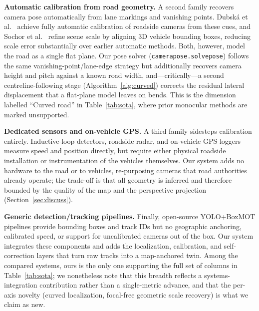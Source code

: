 \documentclass[conference]{IEEEtran}
\renewcommand{\_}{\textunderscore\allowbreak}
\begin{document}
\textbf{Automatic calibration from road geometry.}
A second family recovers camera pose automatically from lane markings and
vanishing points. Dubsk\'a et al.~\cite{dubska2014} achieve fully automatic
calibration of roadside cameras from these cues, and Sochor et
al.~\cite{sochor2019} refine scene scale by aligning 3D vehicle bounding boxes,
reducing scale error substantially over earlier automatic methods. Both, however,
model the road as a single flat plane. Our pose solver
(\texttt{camera\_pose.solve\_pose}) follows the same vanishing-point/lane-edge
strategy but additionally recovers camera height and pitch against a known road
width, and---critically---a second centreline-following stage
(Algorithm~\ref{alg:curved}) corrects the residual lateral displacement that a
flat-plane model leaves on bends. This is the dimension labelled ``Curved road''
in Table~\ref{tab:sota}, where prior monocular methods are marked unsupported.

\textbf{Dedicated sensors and on-vehicle GPS.}
A third family sidesteps calibration entirely. Inductive-loop detectors, roadside
radar, and on-vehicle GPS loggers measure speed and position directly, but require
either physical roadside installation or instrumentation of the vehicles
themselves. Our system adds no hardware to the road or to vehicles, re-purposing
cameras that road authorities already operate; the trade-off is that all geometry
is inferred and therefore bounded by the quality of the map and the perspective
projection (Section~\ref{sec:discuss}).

\textbf{Generic detection/tracking pipelines.}
Finally, open-source YOLO+BoxMOT pipelines provide bounding boxes and track IDs but
no geographic anchoring, calibrated speed, or support for uncalibrated cameras out
of the box. Our system integrates these components and adds the localization,
calibration, and self-correction layers that turn raw tracks into a map-anchored
twin. Among the compared systems, ours is the only one supporting the full set of
columns in Table~\ref{tab:sota}; we nonetheless note that this breadth reflects a
systems-integration contribution rather than a single-metric advance, and that the
per-axis novelty (curved localization, focal-free geometric scale recovery) is what we
claim as new.

\end{document}
